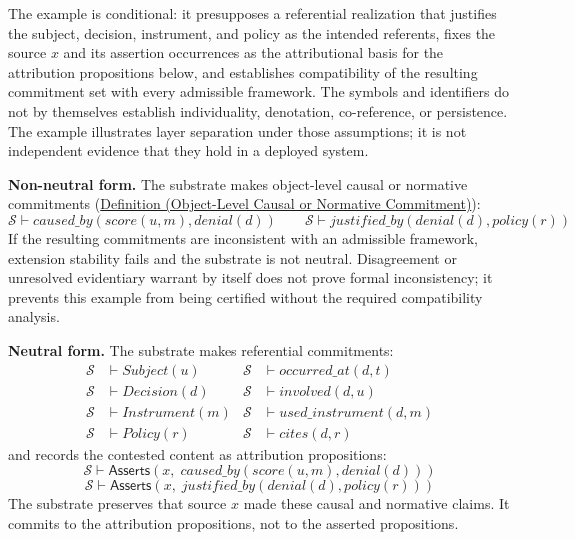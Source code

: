 \documentclass[11pt]{article}
\theoremstyle{plain}
\theoremstyle{definition}
\theoremstyle{remark}
\newcommand{\DefRef}[2]{\hyperref[#1]{Definition (#2)}}
\newcommand{\Substrate}{\mathcal{S}}
\newcommand{\entails}{\vdash}
\newcommand{\Asserts}{\mathsf{Asserts}}
\newcommand{\pred}[1]{\mathit{#1}}
\begin{document}
The example is conditional: it presupposes a referential realization
that justifies the subject, decision, instrument, and policy as the
intended referents, fixes the source $x$ and its assertion occurrences
as the attributional basis for the attribution propositions below,
and establishes compatibility of the resulting
commitment set with every admissible framework.
The symbols and identifiers do not by themselves establish
individuality, denotation, co-reference, or persistence.
The example illustrates layer separation under those assumptions;
it is not independent evidence that they hold in a deployed system.

\textbf{Non-neutral form.}
The substrate makes object-level causal or normative commitments
(\DefRef{se100.def.ObjectLevelCausalNormativeCommitment}
{Object-Level Causal or Normative Commitment}):
\[
  \Substrate \entails \pred{caused\_by}(\pred{score}(u,m), \pred{denial}(d))
  \qquad
  \Substrate \entails \pred{justified\_by}(\pred{denial}(d), \pred{policy}(r))
\]
If the resulting commitments are inconsistent with an admissible
framework, extension stability fails and the substrate is not neutral.
Disagreement or unresolved evidentiary warrant by itself does not prove
formal inconsistency; it prevents this example from being certified
without the required compatibility analysis.

\textbf{Neutral form.}
The substrate makes referential commitments:
\begin{align*}
  \Substrate & \entails \pred{Subject}(u)
             & \Substrate                    & \entails \pred{occurred\_at}(d,t)     \\
  \Substrate & \entails \pred{Decision}(d)
             & \Substrate                    & \entails \pred{involved}(d,u)         \\
  \Substrate & \entails \pred{Instrument}(m)
             & \Substrate                    & \entails \pred{used\_instrument}(d,m) \\
  \Substrate & \entails \pred{Policy}(r)
             & \Substrate                    & \entails \pred{cites}(d,r)
\end{align*}
and records the contested content as attribution propositions:
\[
  \Substrate \entails \Asserts(x,\;
  \pred{caused\_by}(\pred{score}(u,m), \pred{denial}(d)))
\]
\[
  \Substrate \entails \Asserts(x,\;
  \pred{justified\_by}(\pred{denial}(d), \pred{policy}(r)))
\]
The substrate preserves that source $x$
made these causal and normative claims.
It commits to the attribution propositions,
not to the asserted propositions.
\end{document}
